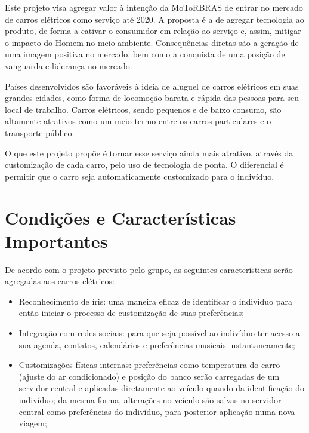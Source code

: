\documentclass[12pt,journal,compsoc]{IEEEtran}
\begin{document}
Este projeto visa agregar valor à intenção da MoToRBRAS de entrar no mercado de carros elétricos como serviço até 2020. A proposta é a de agregar tecnologia ao produto, de forma a cativar o consumidor em relação ao serviço e, assim, mitigar o impacto do Homem no meio ambiente. Consequências diretas são a geração de uma imagem positiva no mercado, bem como a conquista de uma posição de vanguarda e liderança no mercado. 

Países desenvolvidos são favoráveis à ideia de aluguel de carros elétricos em suas grandes cidades, como forma de locomoção barata e rápida das pessoas para seu local de trabalho. Carros elétricos, sendo pequenos e de baixo consumo, são altamente atrativos como um meio-termo entre os carros particulares e o transporte público. 

O que este projeto propõe é tornar esse serviço ainda mais atrativo, através da customização de cada carro, pelo uso de tecnologia de ponta. O diferencial é permitir que o carro seja automaticamente customizado para o indivíduo. 


\section{Condições e Características Importantes}

De acordo com o projeto previsto pelo grupo, as seguintes características serão agregadas aos carros elétricos:

\begin{itemize}

\item Reconhecimento de íris: uma maneira eficaz de identificar o indivíduo para então iniciar o processo de customização de suas preferências;

\item Integração com redes sociais: para que seja possível ao indivíduo ter acesso a sua agenda, contatos, calendários e preferências musicais instantaneamente; 

\item Customizações físicas internas: preferências como temperatura do carro (ajuste do ar condicionado) e posição do banco serão carregadas de um servidor central e aplicadas diretamente ao veículo quando da identificação do indivíduo; da mesma forma, alterações no veículo são salvas no servidor central como preferências do indivíduo, para posterior aplicação numa nova viagem;

\end{itemize}
\end{document}
